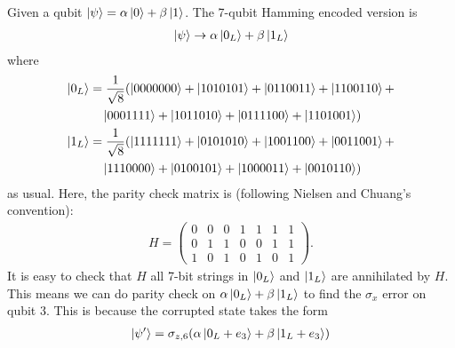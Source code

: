 \documentclass{article}
\theoremstyle{definition}
\newcommand{\al}{\alpha}
\newcommand{\be}{\beta}
\newcommand{\f}[2]{\frac{#1}{#2}}
\begin{document}
\noindent Given a qubit $\ket{\psi} = \al\ket{0} + \be\ket{1}$. The 7-qubit Hamming encoded version is 
\begin{align*}
	\ket{\psi} \to \al\ket{0_L} + \be\ket{1_L}
\end{align*}
where 
\begin{align*}
	\ket{0_L} &= \f{1}{\sqrt{8}}(\ket{0000000} + \ket{1010101} + \ket{0110011} + \ket{1100110} + \\
	&\quad \ket{0001111}+ \ket{1011010} + \ket{0111100} + \ket{1101001}) \\
	\ket{1_L} &= \f{1}{\sqrt{8}}( \ket{1111111} + \ket{0101010} + \ket{1001100} + \ket{0011001} + \\
	&\quad \ket{1110000} + \ket{0100101} + \ket{1000011} + \ket{0010110})
\end{align*}
as usual. Here, the parity check matrix is (following Nielsen and Chuang's convention):
\begin{align*}
	H = \begin{pmatrix}
		0 & 0 & 0 & 1 & 1 & 1 & 1\\
		0 & 1 & 1 & 0 & 0 & 1 & 1\\
		1 & 0 & 1 & 0 & 1 & 0 & 1 
	\end{pmatrix}.
\end{align*}
It is easy to check that $H$ all 7-bit strings in $\ket{0_L}$ and $\ket{1_L}$ are annihilated by $H$. This means we can do parity check on $\al\ket{0_L} + \be\ket{1_L}$ to find the $\sigma_x$ error on qubit 3. This is because the corrupted state takes the form
\begin{align*}
	\ket{\psi'} = \sigma_{z,6} (\al \ket{0_L + e_3} + \be\ket{1_L+e_3})
\end{align*}
\end{document}
